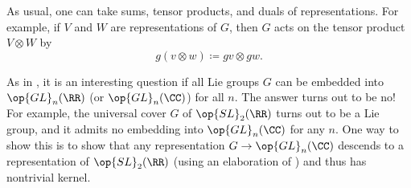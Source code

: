 \documentclass{article}
\begin{document}
\begin{example}
	As usual, one can take sums, tensor products, and duals of representations. For example, if $V$ and $W$ are representations of $G$, then $G$ acts on the tensor product $V\otimes W$ by
	\[g(v\otimes w)\coloneqq gv\otimes gw.\]
\end{example}
\begin{remark}
	As in , it is an interesting question if all Lie groups $G$ can be embedded into $\op{GL}_n(\RR)$ (or $\op{GL}_n(\CC)$) for all $n$. The answer turns out to be no! For example, the universal cover $G$ of $\op{SL}_2(\RR)$ turns out to be a Lie group, and it admits no embedding into $\op{GL}_n(\CC)$ for any $n$. One way to show this is to show that any representation $G\to\op{GL}_n(\CC)$ descends to a representation of $\op{SL}_2(\RR)$ (using an elaboration of ) and thus has nontrivial kernel.
\end{remark}
\end{document}
